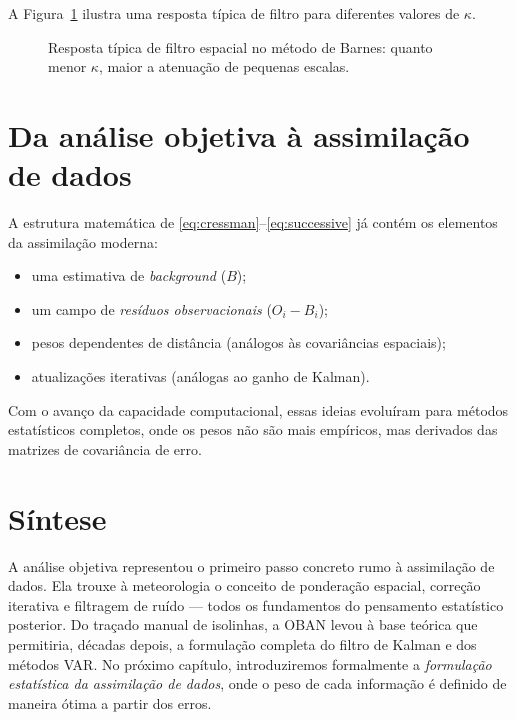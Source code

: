 A Figura~\ref{fig:filter-response} ilustra uma resposta típica de filtro para diferentes valores de $\kappa$.

\begin{figure}[h!]
\centering
{}
\caption{Resposta típica de filtro espacial no método de Barnes: quanto menor $\kappa$, maior a atenuação de pequenas escalas.}
\label{fig:filter-response}
\end{figure}

\section{Da análise objetiva à assimilação de dados}
A estrutura matemática de \eqref{eq:cressman}--\eqref{eq:successive} já contém os elementos da assimilação moderna:
\begin{itemize}
  \item uma estimativa de \emph{background} ($B$);
  \item um campo de \emph{resíduos observacionais} ($O_i - B_i$);
  \item pesos dependentes de distância (análogos às covariâncias espaciais);
  \item atualizações iterativas (análogas ao ganho de Kalman).
\end{itemize}
Com o avanço da capacidade computacional, essas ideias evoluíram para métodos estatísticos completos, onde os pesos não são mais empíricos, mas derivados das matrizes de covariância de erro.

\section{Síntese}
A análise objetiva representou o primeiro passo concreto rumo à assimilação de dados.  
Ela trouxe à meteorologia o conceito de ponderação espacial, correção iterativa e filtragem de ruído — todos os fundamentos do pensamento estatístico posterior.  
Do traçado manual de isolinhas, a OBAN levou à base teórica que permitiria, décadas depois, a formulação completa do filtro de Kalman e dos métodos VAR.  
No próximo capítulo, introduziremos formalmente a \emph{formulação estatística da assimilação de dados}, onde o peso de cada informação é definido de maneira ótima a partir dos erros.

